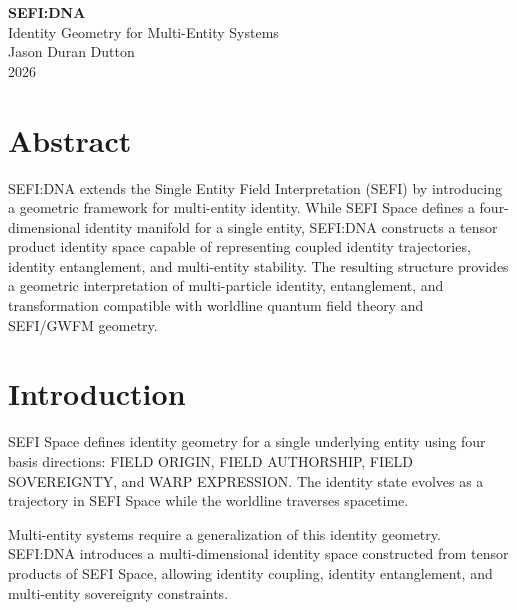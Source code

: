 \documentclass[12pt,twoside]{article}
\begin{document}
\begin{center}
    {\Large \textbf{SEFI:DNA}}\\

\vspace{0.5cm}
    {\large Identity Geometry for Multi-Entity Systems}\\

\vspace{0.5cm}
    {\large Jason Duran Dutton}\\

\vspace{0.25cm}
    {\large 2026}
\end{center}

\vspace{1cm}

\section*{Abstract}

SEFI:DNA extends the Single Entity Field Interpretation (SEFI) by introducing a geometric
framework for multi-entity identity. While SEFI Space defines a four-dimensional identity
manifold for a single entity, SEFI:DNA constructs a tensor product identity space capable of
representing coupled identity trajectories, identity entanglement, and multi-entity stability.
The resulting structure provides a geometric interpretation of multi-particle identity,
entanglement, and transformation compatible with worldline quantum field theory and
SEFI/GWFM geometry.

\vspace{0.5cm}

\section{Introduction}

SEFI Space defines identity geometry for a single underlying entity using four basis
directions: FIELD ORIGIN, FIELD AUTHORSHIP, FIELD SOVEREIGNTY, and WARP
EXPRESSION. The identity state evolves as a trajectory in SEFI Space while the worldline
traverses spacetime.

Multi-entity systems require a generalization of this identity geometry. SEFI:DNA
introduces a multi-dimensional identity space constructed from tensor products of SEFI
Space, allowing identity coupling, identity entanglement, and multi-entity sovereignty
constraints.
\end{document}
